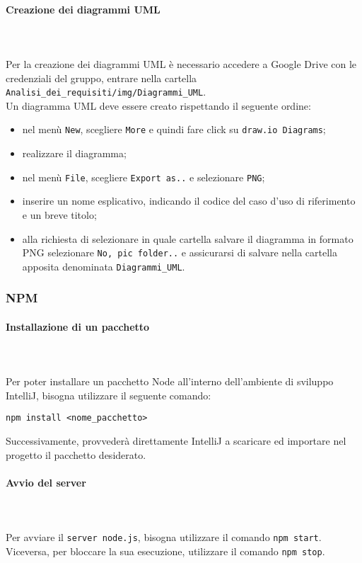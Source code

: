 	\paragraph*{Creazione dei diagrammi UML} \mbox{} \\ \mbox{} \\
	Per la creazione dei diagrammi UML è necessario accedere a Google Drive con le credenziali del gruppo, entrare nella cartella \texttt{Analisi\_dei\_requisiti/img/Diagrammi\_UML}. \\ Un diagramma UML deve essere creato rispettando il seguente ordine: \begin{itemize}
\item nel menù \texttt{New}, scegliere \texttt{More} e quindi fare click su \texttt{draw.io Diagrams};
\item realizzare il diagramma;
\item nel menù \texttt{File}, scegliere \texttt{Export as..} e selezionare \texttt{PNG};
\item inserire un nome esplicativo, indicando il codice del caso d'uso di riferimento e un breve titolo;
\item alla richiesta di selezionare in quale cartella salvare il diagramma in formato PNG selezionare \texttt{No, pic folder..} e assicurarsi di salvare nella cartella apposita denominata \texttt{Diagrammi\_UML}.
\end{itemize}

	\subsubsection{NPM}
	\paragraph*{Installazione di un pacchetto} \mbox{} \\ \mbox{} \\
	Per poter installare un pacchetto Node all'interno dell'ambiente di sviluppo IntelliJ, bisogna utilizzare il seguente comando:\\
	\centerline{\texttt{npm install <nome\_pacchetto>}}
	Successivamente, provvederà direttamente IntelliJ a scaricare ed importare nel progetto il pacchetto desiderato.
	
	\paragraph*{Avvio del server} \mbox{} \\ \mbox{} \\
	Per avviare il \texttt{server node.js}, bisogna utilizzare il comando \texttt{npm start}.\\
	Viceversa, per bloccare la sua esecuzione, utilizzare il comando \texttt{npm stop}.

